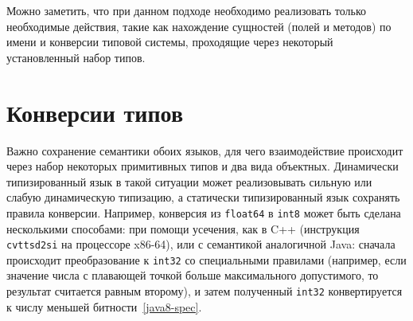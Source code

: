 \documentclass[times,specification,annotation]{itmo-student-thesis}
\begin{document}
Можно заметить, что при данном подходе необходимо реализовать только необходимые действия, такие как нахождение сущностей (полей и методов) по имени и конверсии типовой системы, проходящие через некоторый установленный набор типов.

\section{Конверсии типов}
Важно сохранение семантики обоих языков, для чего взаимодействие происходит через набор некоторых примитивных типов и два вида объектных. Динамически типизированный язык в такой ситуации может реализовывать сильную или слабую динамическую типизацию, а статически типизированный язык сохранять правила конверсии. Например, конверсия из \texttt{float64} в \texttt{int8} может быть сделана несколькими способами: при помощи усечения, как в C++ (инструкция \texttt{cvttsd2si} на процессоре x86-64), или с семантикой аналогичной Java: сначала происходит преобразование к \texttt{int32} со специальными правилами (например, если значение числа с плавающей точкой больше максимального допустимого, то результат считается равным второму), и затем полученный \texttt{int32} конвертируется к числу меньшей битности~\ref{java8-spec}.\\
\end{document}

